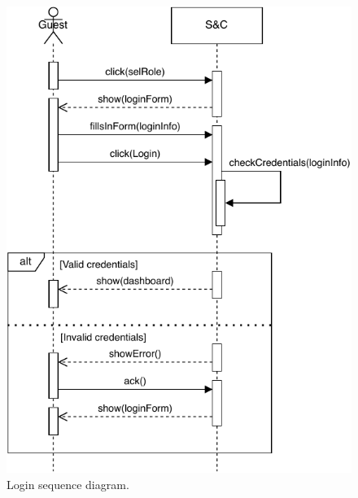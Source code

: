 \begin{figure}[H]
    \begin{center}
        \includegraphics[width=0.8\linewidth]{Images/SequenceDiagram/LoginSD.pdf}
        \caption{Login sequence diagram.}
        \label{fig:login_seqdiag}%
    \end{center}
\end{figure}

\newpage

